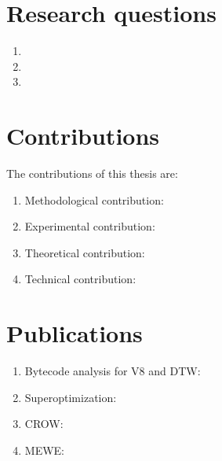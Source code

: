 \section{Research questions}
\label{intro:definition:rq}


\begin{enumerate}
    \item \rqone

    \item \rqtwo
    
    \item \rqthree
    
\end{enumerate}


\section{Contributions}

The contributions of this thesis are:

\begin{enumerate}[label=(\subscript{C}{{\arabic*}})]
    \item Methodological contribution: \todo{}
    \item Experimental contribution: \todo{}
    \item Theoretical contribution: \todo{}
    \item Technical contribution: \todo{} 
\end{enumerate}

\section{Publications}

\begin{enumerate}[label=(\subscript{P}{{\arabic*}})]
    \item Bytecode analysis for V8 and DTW: \todo{}
    \item Superoptimization: \todo{}
    \item CROW: \todo{}
    \item MEWE: \todo{}
\end{enumerate}

